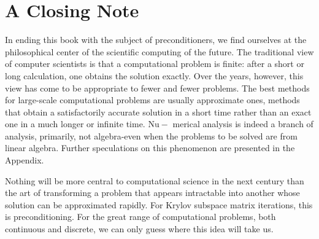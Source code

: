 \section{A Closing Note} 
In ending this book with the subject of preconditioners, we find ourselves at the philosophical center of the scientific computing of the future. The traditional view of computer scientists is that a computational problem is finite: after a short or long calculation, one obtains the solution exactly. Over the years, however, this view has come to be appropriate to fewer and fewer problems. The best methods for large-scale computational problems are usually approximate ones, methods that obtain a satisfactorily accurate solution in a short time rather than an exact one in a much longer or infinite time. $\mathrm{Nu}-$ merical analysis is indeed a branch of analysis, primarily, not algebra-even when the problems to be solved are from linear algebra. Further speculations on this phenomenon are presented in the Appendix.

Nothing will be more central to computational science in the next century than the art of transforming a problem that appears intractable into another whose solution can be approximated rapidly. For Krylov subspace matrix iterations, this is preconditioning. For the great range of computational problems, both continuous and discrete, we can only guess where this idea will take us.
 